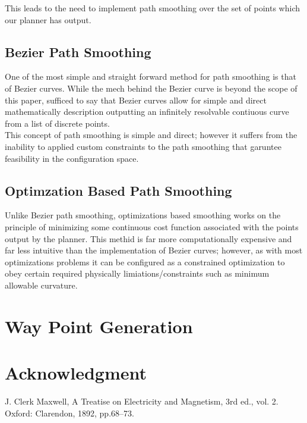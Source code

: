 \documentclass[journal]{IEEEtran}
\begin{document}
This leads to the need to implement path smoothing over the set of points which our planner has output.

\subsection{Bezier Path Smoothing}

One of the most simple and straight forward method for path smoothing is that of Bezier curves. While the mech behind the Bezier curve is beyond the scope of this paper, sufficed to say that Bezier curves allow for simple and direct mathematically description outputting an infinitely resolvable contiuous curve from a list of discrete points.\\

This concept of path smoothing is simple and direct; however it suffers from the inability to applied custom constraints to the path smoothing that garuntee feasibility in the configuration space.

\subsection{Optimzation Based Path Smoothing}

Unlike Bezier path smoothing, optimizations based smoothing works on the principle of minimizing some continuous cost function associated with the points output by the planner. This methid is far more computationally expensive and far less intuitive than the implementation of Bezier curves; however, as with most optimizations problems it can be configured as a constrained optimization to obey certain required physically limiations/constraints such as minimum allowable curvature.  


\section{Way Point Generation}

\section{Acknowledgment}

\begin{thebibliography}{00}
 J. Clerk Maxwell, A Treatise on Electricity and Magnetism, 3rd ed., vol. 2. Oxford: Clarendon, 1892, pp.68--73.
\end{thebibliography}
\vspace{12pt}
\end{document}
